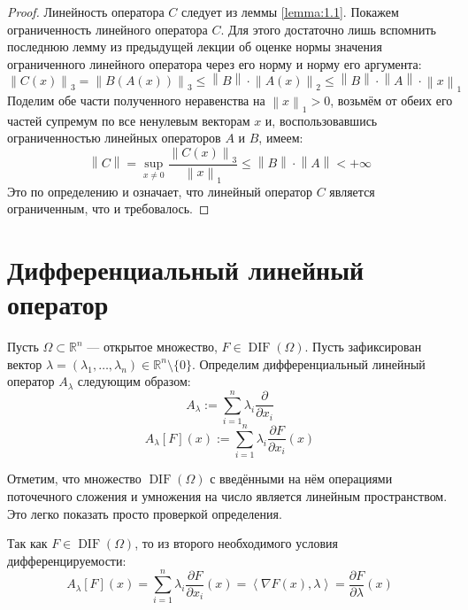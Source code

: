 \documentclass[11pt]{article}
\DeclareMathOperator{\DIF}{DIF}
\begin{document}
\begin{proof}
    Линейность оператора $C$ следует из леммы \ref{lemma:1.1}. Покажем ограниченность линейного оператора $C$. 
    Для этого достаточно лишь вспомнить последнюю лемму из предыдущей лекции об оценке нормы значения ограниченного линейного оператора через его норму и норму его аргумента: 
    \[\left\lVert C(x) \right\rVert_3 = \left\lVert B(A(x)) \right\rVert_3 \leq \left\lVert B \right\rVert \cdot \left\lVert A(x) \right\rVert_2 \leq \left\lVert B \right\rVert \cdot \left\lVert A \right\rVert \cdot \left\lVert x \right\rVert_1\]
    Поделим обе части полученного неравенства на $\left\lVert x \right\rVert_1 > 0$, возьмём от обеих его частей супремум по все ненулевым векторам $x$ и, воспользовавшись ограниченностью линейных операторов $A$ и $B$, имеем:
    \[\left\lVert C \right\rVert = \sup_{x \neq 0} \frac{\left\lVert C(x) \right\rVert_3}{\left\lVert x \right\rVert_1} \leq \left\lVert B \right\rVert \cdot \left\lVert A \right\rVert < +\infty\]
    Это по определению и означает, что линейный оператор $C$ является ограниченным, что и требовалось.
\end{proof}

\section{Дифференциальный линейный оператор}

\begin{definition}
    Пусть $\Omega \subset \mathbb{R}^n$ --- открытое множество, $F \in \DIF \left(\Omega\right)$. Пусть зафиксирован вектор $\lambda = \left(\lambda_1, \ldots, \lambda_n\right) \in \mathbb{R}^n \setminus \{0\}$. Определим дифференциальный линейный оператор $A_{\lambda}$ следующим образом:
    \[A_{\lambda} := \sum_{i = 1}^n \lambda_i \frac{\partial}{\partial x_i}\]
    \begin{equation*}
        A_{\lambda}[F](x) := \sum_{i = 1}^n \lambda_i \frac{\partial F}{\partial x_i} (x)
    \end{equation*}
\end{definition}

\begin{remark}
    Отметим, что множество $\DIF \left(\Omega\right)$ с введёнными на нём операциями поточечного сложения и умножения на число является линейным пространством. Это легко показать просто проверкой определения.
\end{remark}

\begin{remark}
    Так как $F \in \DIF \left(\Omega\right)$, то из второго необходимого условия дифференцируемости:
    \[A_{\lambda}[F](x) = \sum_{i = 1}^n \lambda_i \frac{\partial F}{\partial x_i} (x) = \left\langle \nabla F(x), \lambda \right\rangle = \frac{\partial F}{\partial \lambda} (x) \]
\end{remark}
\end{document}
